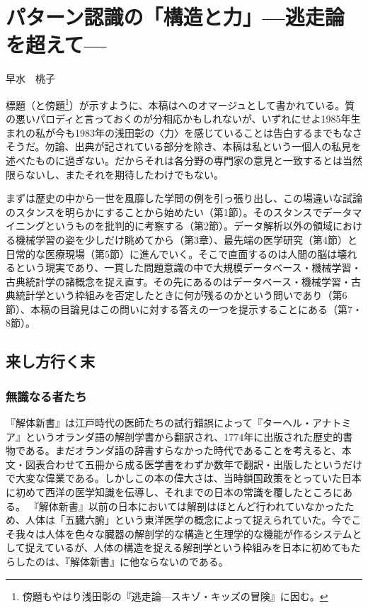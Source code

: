 
\chapter{パターン認識の「構造と力」---逃走論を超えて---}

\begin{flushright}
 早水　桃子 %
\end{flushright}

\begin{spacing}{0.6}
\noindent
{\footnotesize{標題（と傍題\footnote{傍題もやはり浅田彰の『逃走論---スキゾ・キッズの冒険』に因む。}）が示すように、本稿はへのオマージュとして書かれている。質の悪いパロディと言っておくのが分相応かもしれないが、いずれにせよ1985年生まれの私が今も1983年の浅田彰の〈力〉を感じていることは告白するまでもなさそうだ。勿論、出典が記されている部分を除き、本稿は私という一個人の私見を述べたものに過ぎない。だからそれは各分野の専門家の意見と一致するとは当然限らないし、またそれを期待したわけでもない。

\noindent
まずは歴史の中から一世を風靡した学問の例を引っ張り出し、この場違いな試論のスタンスを明らかにすることから始めたい（第1節）。そのスタンスでデータマイニングというものを批判的に考察する（第2節）。データ解析以外の領域における機械学習の姿を少しだけ眺めてから（第3章）、最先端の医学研究（第4節）と日常的な医療現場（第5節）に進んでいく。そこで直面するのは人間の脳は壊れるという現実であり、一貫した問題意識の中で大規模データベース・機械学習・古典統計学の諸概念を捉え直す。その先にあるのはデータベース・機械学習・古典統計学という枠組みを否定したときに何が残るのかという問いであり（第6節）、本稿の目論見はこの問いに対する答えの一つを提示することにある（第7・8節）。
}}
\end{spacing}
 
\section{来し方行く末}
\subsection{無識なる者たち}
『解体新書』は江戸時代の医師たちの試行錯誤によって『ターヘル・アナトミア』というオランダ語の解剖学書から翻訳され、1774年に出版された歴史的書物である。まだオランダ語の辞書すらなかった時代であることを考えると、本文・図表合わせて五冊から成る医学書をわずか数年で翻訳・出版したというだけで大変な偉業である。しかしこの本の偉大さは、当時鎖国政策をとっていた日本に初めて西洋の医学知識を伝導し、それまでの日本の常識を覆したところにある。
『解体新書』以前の日本においては解剖はほとんど行われていなかったため、人体は「五臓六腑」という東洋医学の概念によって捉えられていた。今でこそ我々は人体を色々な臓器の解剖学的な構造と生理学的な機能が作るシステムとして捉えているが、人体の構造を捉える解剖学という枠組みを日本に初めてもたらしたのは、『解体新書』に他ならないのである。

